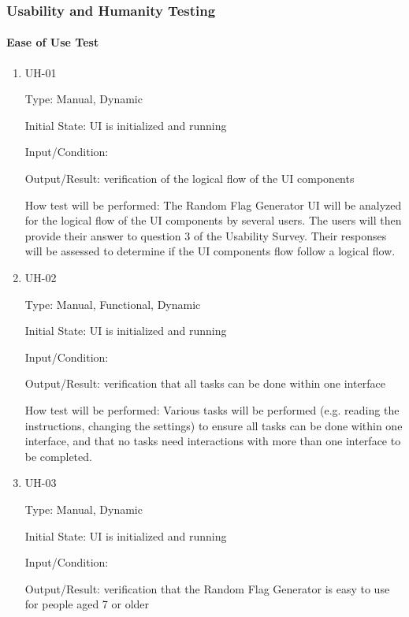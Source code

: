 \documentclass[12pt, titlepage]{article}
\begin{document}
\subsubsection{Usability and Humanity Testing}

\paragraph{Ease of Use Test}

\begin{enumerate}

\item{UH-01\\}

Type: Manual, Dynamic

Initial State: UI is initialized and running

Input/Condition: 

Output/Result: verification of the logical flow of the UI components

How test will be performed: The Random Flag Generator UI will be analyzed for
the logical flow of the UI components by several users. The users will then provide their answer to question 3 of the Usability Survey. Their responses
will be assessed to determine if the UI components flow follow a logical flow.

\item{UH-02\\}

Type: Manual, Functional, Dynamic

Initial State: UI is initialized and running

Input/Condition: 

Output/Result: verification that all tasks can be done within one interface

How test will be performed: Various tasks will be performed (e.g. reading the
instructions, changing the settings) to ensure all tasks can be done within
one interface, and that no tasks need interactions with more than one
interface to be completed.

\item{UH-03\\}

Type: Manual, Dynamic

Initial State: UI is initialized and running

Input/Condition: 

Output/Result: verification that the Random Flag Generator is easy to use for
people aged 7 or older


\end{enumerate}
\end{document}
